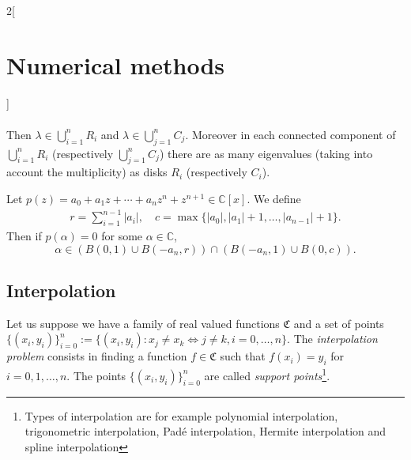 \documentclass[class=article,10pt,crop=false]{standalone}
\begin{document}
\begin{multicols}{2}[\section{Numerical methods}]
\begin{theorem}
\begin{gather*}
\end{gather*}
Then $\lambda\in\bigcup_{i=1}^nR_i$ and $\lambda\in\bigcup_{j=1}^nC_j$. Moreover in each connected component of $\bigcup_{i=1}^nR_i$ (respectively $\bigcup_{j=1}^nC_j$) there are as many eigenvalues (taking into account the multiplicity) as disks $R_i$ (respectively $C_i$).
\end{theorem}
\begin{corollary}
Let $p(z)=a_0+a_1z+\cdots+a_nz^n+z^{n+1}\in\mathbb{C}[x]$. We define
\begin{gather*}
    r=\sum_{i=1}^{n-1}|a_i|,\quad c=\max\{|a_0|,|a_1|+1,\ldots,|a_{n-1}|+1\}.
\end{gather*}
Then if $p(\alpha)=0$ for some $\alpha\in\mathbb{C}$, $$\alpha\in(B(0,1)\cup B(-a_n,r))\cap(B(-a_n,1)\cup B(0,c)).$$
\end{corollary}
\subsection{Interpolation}
\begin{definition}
Let us suppose we have a family of real valued functions $\mathfrak{C}$ and a set of points $\{(x_i,y_i)\}_{i=0}^n:=\{(x_i,y_i):x_j\ne x_k\iff j\ne k,i=0,\ldots,n\}$. The \textit{interpolation problem} consists in finding a function $f\in\mathfrak{C}$ such that $f(x_i)=y_i$ for $i=0,1,\ldots,n$. The points $\{(x_i,y_i)\}_{i=0}^n$ are called \textit{support points}\footnote{Types of interpolation are for example polynomial interpolation, trigonometric interpolation, Padé interpolation, Hermite interpolation and spline interpolation}.
\end{definition}

\end{multicols}
\end{document}
